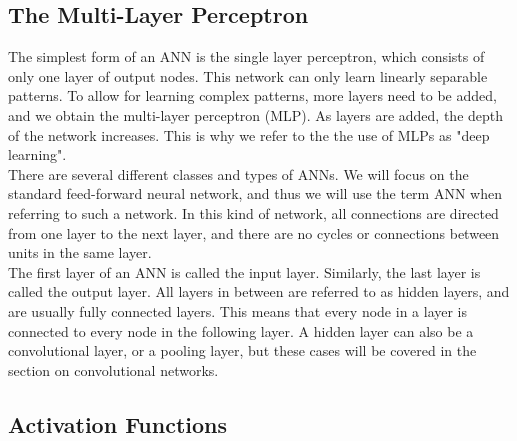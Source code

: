 \subsection{The Multi-Layer Perceptron}

\noindent The simplest form of an ANN is the single layer perceptron, which consists of only one layer of output nodes. This network can only learn linearly separable patterns. To allow for learning complex patterns, more layers need to be added, and we obtain the multi-layer perceptron (MLP). As layers are added, the depth of the network increases. This is why we refer to the the use of MLPs as "deep learning". \\

\noindent There are several different classes and types of ANNs. We will focus on the standard feed-forward neural network, and thus we will use the term ANN when referring to such a network. In this kind of network, all connections are directed from one layer to the next layer, and there are no cycles or connections between units in the same layer. \\

\noindent The first layer of an ANN is called the input layer. Similarly, the last layer is called the output layer. All layers in between are referred to as hidden layers, and are usually fully connected layers. This means that every node in a layer is connected to every node in the following layer. A hidden layer can also be a convolutional layer, or a pooling layer, but these cases will be covered in the section on convolutional networks.

\subsection{Activation Functions}

